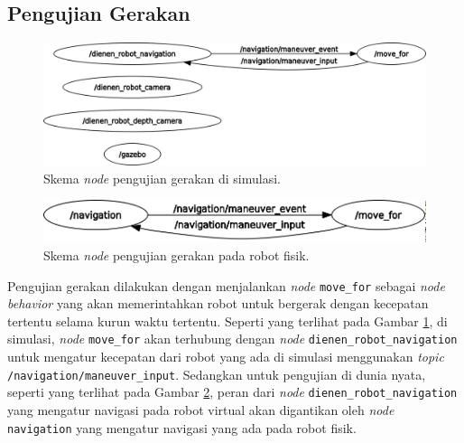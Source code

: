 \subsection{Pengujian Gerakan}
\label{subsec:pengujiangerakan}

\begin{figure} [ht]
  \centering
  \includegraphics[scale=0.25]{gambar/nodeujigeraksimulasi.png}
  \caption{Skema \emph{node} pengujian gerakan di simulasi.}
  \label{fig:nodeujigeraksimulasi}
\end{figure}

\begin{figure} [ht]
  \centering
  \includegraphics[scale=0.3]{gambar/nodeujigerakfisik.png}
  \caption{Skema \emph{node} pengujian gerakan pada robot fisik.}
  \label{fig:nodeujigerakfisik}
\end{figure}

Pengujian gerakan dilakukan dengan menjalankan \emph{node} \lstinline{move_for} sebagai \emph{node behavior} yang akan memerintahkan robot untuk bergerak dengan kecepatan tertentu selama kurun waktu tertentu.
Seperti yang terlihat pada Gambar \ref{fig:nodeujigeraksimulasi}, di simulasi, \emph{node} \lstinline{move_for} akan terhubung dengan \emph{node} \lstinline{dienen_robot_navigation} untuk mengatur kecepatan dari robot yang ada di simulasi menggunakan \emph{topic} \lstinline{/navigation/maneuver_input}.
Sedangkan untuk pengujian di dunia nyata, seperti yang terlihat pada Gambar \ref{fig:nodeujigerakfisik}, peran dari \emph{node} \lstinline{dienen_robot_navigation} yang mengatur navigasi pada robot virtual akan digantikan oleh \emph{node} \lstinline{navigation} yang mengatur navigasi yang ada pada robot fisik.

